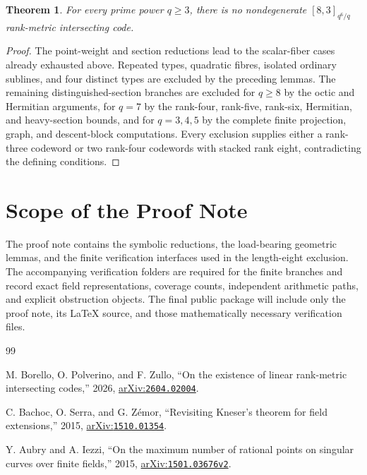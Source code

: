 \documentclass[12pt,letterpaper,onecolumn]{article}
\newcommand{\arxiv}[1]{\href{https://arxiv.org/abs/#1}{arXiv:\nolinkurl{#1}}}
\newtheorem{theorem}{Theorem}
\theoremstyle{definition}
\theoremstyle{remark}
\begin{document}
\begin{theorem}\label{thm:core-length-eight}
For every prime power \(q\ge3\), there is no nondegenerate
\([8,3]_{q^6/q}\) rank-metric intersecting code.
\end{theorem}
\begin{proof}
The point-weight and section reductions lead to the scalar-fiber cases
already exhausted above.  Repeated types, quadratic fibres, isolated
ordinary sublines, and four distinct types are excluded by the preceding
lemmas.  The remaining distinguished-section branches are excluded for
\(q\ge8\) by the octic and Hermitian arguments, for \(q=7\) by the rank-four,
rank-five, rank-six, Hermitian, and heavy-section bounds, and for \(q=3,4,5\)
by the complete finite projection, graph, and descent-block computations.
Every exclusion supplies either a rank-three codeword or two rank-four
codewords with stacked rank eight, contradicting the defining conditions.
\end{proof}

\section{Scope of the Proof Note}
The proof note contains the symbolic reductions, the load-bearing geometric
lemmas, and the finite verification interfaces used in the length-eight
exclusion.  The accompanying verification folders are required for the
finite branches and record exact field representations, coverage counts,
independent arithmetic paths, and explicit obstruction objects.  The final
public package will include only the proof note, its LaTeX source, and those
mathematically necessary verification files.

\begin{thebibliography}{99}

 M. Borello, O. Polverino, and F. Zullo, ``On the existence of linear rank-metric intersecting codes,'' 2026, \arxiv{2604.02004}.

 C. Bachoc, O. Serra, and G. Z\'emor, ``Revisiting Kneser's theorem for field extensions,'' 2015, \arxiv{1510.01354}.

 Y. Aubry and A. Iezzi, ``On the maximum number of rational points on singular curves over finite fields,'' 2015, \arxiv{1501.03676v2}.
\end{thebibliography}
\end{document}

